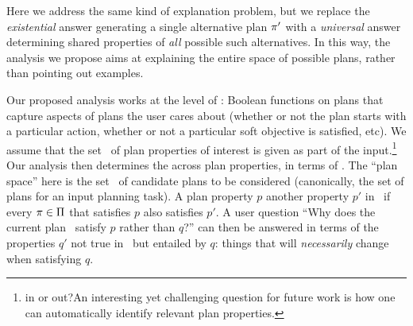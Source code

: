 Here we address the same kind of explanation problem, but we replace
the \emph{existential} answer generating a single alternative plan
$\pi'$ with a \emph{universal} answer determining shared properties
of \emph{all} possible such alternatives. In this way, the analysis we
propose aims at explaining the entire space of possible plans, rather
than pointing out examples.

Our proposed analysis works at the level of :
Boolean functions on plans that capture aspects of plans the user
cares about (whether or not the plan starts with a particular action,
whether or not a particular soft objective is satisfied, etc). We
assume that the set \props\ of plan properties of interest is given as
part of the input.\footnote{{\color{red}in or out?}An interesting yet
  challenging question for future work is how one can automatically
  identify relevant plan properties.} Our analysis then determines the
 across plan properties, in terms of
. The ``plan space'' here is the set
\plans\ of candidate plans to be considered (canonically, the set of
plans for an input planning task). A plan property $p$
 another property $p'$ in \plans\ if every $\pi \in
\Pi$ that satisfies $p$ also satisfies $p'$. A user question ``Why
does the current plan \plan\ satisfy $p$ rather than $q$?'' can then
be answered in terms of the properties $q'$ not true in \plan\ but
entailed by $q$: things that will \emph{necessarily} change when
satisfying $q$.

